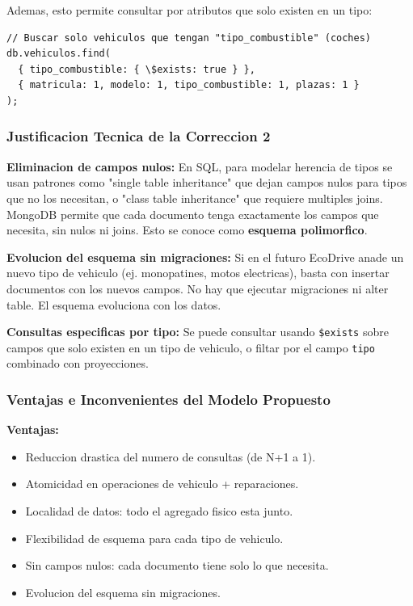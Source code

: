 Ademas, esto permite consultar por atributos que solo existen en un tipo:

\begin{lstlisting}[caption=Consulta filtrando por campo exclusivo de coches]
// Buscar solo vehiculos que tengan "tipo_combustible" (coches)
db.vehiculos.find(
  { tipo_combustible: { \$exists: true } },
  { matricula: 1, modelo: 1, tipo_combustible: 1, plazas: 1 }
);
\end{lstlisting}

\subsubsection{Justificacion Tecnica de la Correccion 2}

\textbf{Eliminacion de campos nulos:} En SQL, para modelar herencia de tipos se usan patrones como "single table inheritance" que dejan campos nulos para tipos que no los necesitan, o "class table inheritance" que requiere multiples joins. MongoDB permite que cada documento tenga exactamente los campos que necesita, sin nulos ni joins. Esto se conoce como \textbf{esquema polimorfico}.

\textbf{Evolucion del esquema sin migraciones:} Si en el futuro EcoDrive anade un nuevo tipo de vehiculo (ej. monopatines, motos electricas), basta con insertar documentos con los nuevos campos. No hay que ejecutar migraciones ni alter table. El esquema evoluciona con los datos.

\textbf{Consultas especificas por tipo:} Se puede consultar usando \texttt{\$exists} sobre campos que solo existen en un tipo de vehiculo, o filtar por el campo \texttt{tipo} combinado con proyecciones.

\subsubsection{Ventajas e Inconvenientes del Modelo Propuesto}

\textbf{Ventajas:}
\begin{itemize}
    \item Reduccion drastica del numero de consultas (de N+1 a 1).
    \item Atomicidad en operaciones de vehiculo + reparaciones.
    \item Localidad de datos: todo el agregado fisico esta junto.
    \item Flexibilidad de esquema para cada tipo de vehiculo.
    \item Sin campos nulos: cada documento tiene solo lo que necesita.
    \item Evolucion del esquema sin migraciones.
\end{itemize}

